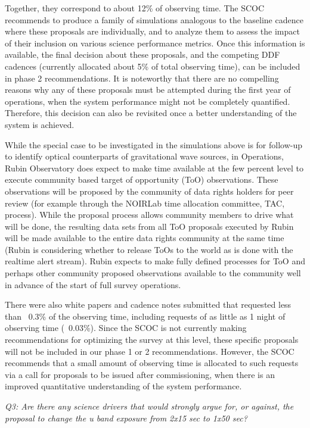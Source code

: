 Together, they correspond to about 12\% of observing time. The SCOC recommends to produce a family of simulations analogous to the baseline cadence where these proposals are individually, and to analyze them to assess the impact of their inclusion on various science performance metrics. Once this information is available, the final decision about these proposals, and the competing DDF cadences (currently allocated about 5\% of total observing time), can be included in phase 2 recommendations. It is noteworthy that there are no compelling reasons why any of these proposals must be attempted during the first year of operations, when the system performance might not be completely quantified. Therefore, this decision can also be revisited once a better understanding of the system is achieved.

While the special case to be investigated in the simulations above is for follow-up to identify optical counterparts of gravitational wave sources, in Operations, Rubin Observatory does expect to make time available at the few percent level to execute community based target of opportunity (ToO) observations. These observations will be proposed by the community of data rights holders for peer review (for example through the NOIRLab time allocation committee, TAC, process). While the proposal process allows community members to drive what will be done, the resulting data sets from all ToO proposals executed by Rubin will be made available to the entire data rights community at the same time (Rubin is considering whether to release ToOs to the world as is done with the realtime alert stream). Rubin expects to make fully defined processes for ToO and perhaps other community proposed observations available to the community well in advance of the start of full survey operations.

There were also white papers and cadence notes submitted that requested less than ~0.3\% of the observing time, including requests of as little as 1 night of observing time (~0.03\%). Since the SCOC is not currently making recommendations for optimizing the survey at this level, these specific proposals will not be included in our phase 1 or 2 recommendations. However, the SCOC recommends that a small amount of observing time is allocated to such requests via a call for proposals to be issued after commissioning, when there is an improved quantitative understanding of the system performance. 

{\it Q3:  Are there any science drivers that would strongly argue for, or against, the proposal to change the u band exposure from 2x15 sec to 1x50 sec? }


